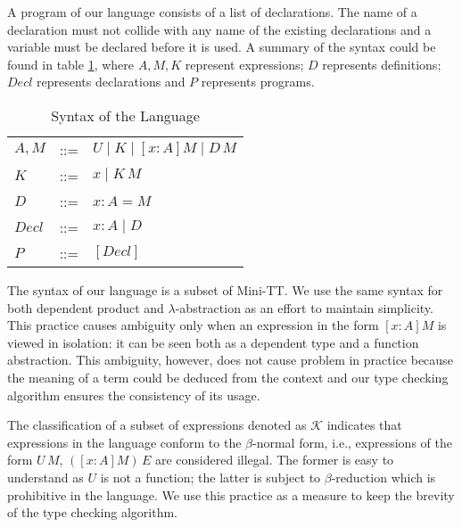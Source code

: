 A program of our language consists of a list of declarations. The name of a declaration must not collide with any name of the existing declarations and a variable must be declared before it is used. A summary of the syntax could be found in table \ref{theory:tab:syntax}, where $A,M,K$ represent expressions; $D$ represents definitions; $Decl$ represents declarations and $P$ represents programs.
\begin{table}[h]
  \centering
  \begin{tabular}{l l l}
    $A,M$ & ::= & $U \mid K \mid [x : A]M \mid D\,M$ \\
    $K$ & ::= & $x \mid K\,M$ \\
    $D$ & ::= & $x : A = M$ \\
    $Decl$ & ::= & $x : A \mid D$ \\
    $P$ & ::= & $[Decl]$
  \end{tabular}
  \caption{Syntax of the Language}
  \label{theory:tab:syntax}
\end{table}

The syntax of our language is a subset of Mini-TT\cite{coquand2009simple}. We use the same syntax for both dependent product and $\lambda$-abstraction as an effort to maintain simplicity. This practice causes ambiguity only when an expression in the form $[x : A] M$ is viewed in isolation: it can be seen both as a dependent type and a function abstraction. This ambiguity, however, does not cause problem in practice because the meaning of a term could be deduced from the context and our type checking algorithm ensures the consistency of its usage.

The classification of a subset of expressions denoted as $\mathcal{K}$ indicates that expressions in the language conform to the $\beta$-normal form, i.e., expressions of the form $U\,M$, $([x:A]M)\,E$ are considered illegal. The former is easy to understand as $U$ is not a function; the latter is subject to $\beta$-reduction which is prohibitive in the language. We use this practice as a measure to keep the brevity of the type checking algorithm.

